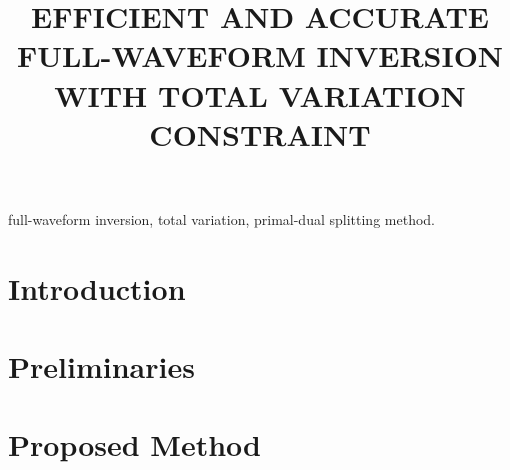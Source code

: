 \documentclass[conference,a4paper]{IEEEtran}
\begin{document}
	

	\title{\uppercase{Efficient and Accurate Full-Waveform Inversion with Total Variation Constraint}}


	\author{

		\and


		\and


		
	}

	\maketitle

	\begin{abstract}  \end{abstract}

	\begin{IEEEkeywords} full-waveform inversion, total variation, primal-dual splitting method. \end{IEEEkeywords}

	\section{Introduction}      \label{sec:Introduction}    

	\section{Preliminaries}     \label{sec:Preliminaries}   

	\section{Proposed Method}   \label{sec:ProposedMethod}  
\end{document}
